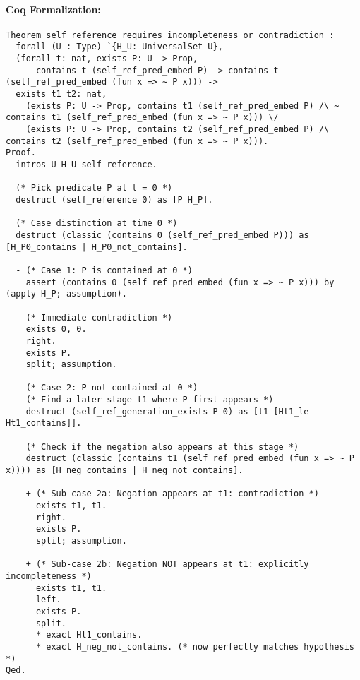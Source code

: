 \documentclass[12pt]{article}
\begin{document}
\paragraph{Coq Formalization:}
\begin{lstlisting}[language=Coq]
Theorem self_reference_requires_incompleteness_or_contradiction :
  forall (U : Type) `{H_U: UniversalSet U},
  (forall t: nat, exists P: U -> Prop, 
      contains t (self_ref_pred_embed P) -> contains t (self_ref_pred_embed (fun x => ~ P x))) ->
  exists t1 t2: nat, 
    (exists P: U -> Prop, contains t1 (self_ref_pred_embed P) /\ ~ contains t1 (self_ref_pred_embed (fun x => ~ P x))) \/
    (exists P: U -> Prop, contains t2 (self_ref_pred_embed P) /\ contains t2 (self_ref_pred_embed (fun x => ~ P x))).
Proof.
  intros U H_U self_reference.

  (* Pick predicate P at t = 0 *)
  destruct (self_reference 0) as [P H_P].

  (* Case distinction at time 0 *)
  destruct (classic (contains 0 (self_ref_pred_embed P))) as [H_P0_contains | H_P0_not_contains].
  
  - (* Case 1: P is contained at 0 *)
    assert (contains 0 (self_ref_pred_embed (fun x => ~ P x))) by (apply H_P; assumption).

    (* Immediate contradiction *)
    exists 0, 0.
    right.
    exists P.
    split; assumption.

  - (* Case 2: P not contained at 0 *)
    (* Find a later stage t1 where P first appears *)
    destruct (self_ref_generation_exists P 0) as [t1 [Ht1_le Ht1_contains]].

    (* Check if the negation also appears at this stage *)
    destruct (classic (contains t1 (self_ref_pred_embed (fun x => ~ P x)))) as [H_neg_contains | H_neg_not_contains].

    + (* Sub-case 2a: Negation appears at t1: contradiction *)
      exists t1, t1.
      right.
      exists P.
      split; assumption.

    + (* Sub-case 2b: Negation NOT appears at t1: explicitly incompleteness *)
      exists t1, t1.
      left.
      exists P.
      split.
      * exact Ht1_contains.
      * exact H_neg_not_contains. (* now perfectly matches hypothesis *)
Qed.
\end{lstlisting}
\end{document}
